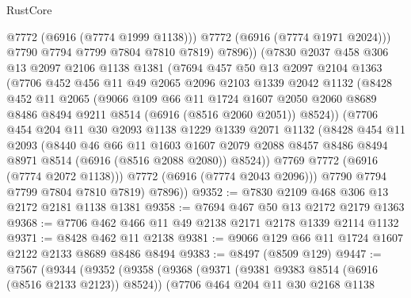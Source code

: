 \begin{lexlean}{RustCore}
\begin{coremodule}
                @7772
                (@6916 (@7774 @1999 @1138)))
              @7772
              (@6916 (@7774 @1971 @2024)))
            @7790
            @7794
            @7799
            @7804
            @7810
            @7819)
          @7896))
      (@7830
        @2037
        @458
        @306
        @13
        @2097
        @2106
        @1138
        @1381
        (@7694
          @457
          @50
          @13
          @2097
          @2104
          @1363
          (@7706
            @452
            @456
            @11
            @49
            @2065
            @2096
            @2103
            @1339
            @2042
            @1132
            (@8428
              @452
              @11
              @2065
              (@9066
                @109
                @66
                @11
                @1724
                @1607
                @2050
                @2060
                @8689
                @8486
                @8494
                @9211
                @8514
                (@6916 (@8516 @2060 @2051))
                @8524))
            (@7706
              @454
              @204
              @11
              @30
              @2093
              @1138
              @1229
              @1339
              @2071
              @1132
              (@8428
                @454
                @11
                @2093
                (@8440
                  @46
                  @66
                  @11
                  @1603
                  @1607
                  @2079
                  @2088
                  @8457
                  @8486
                  @8494
                  @8971
                  @8514
                  (@6916 (@8516 @2088 @2080))
                  @8524))
              @7769
              @7772
              (@6916 (@7774 @2072 @1138)))
            @7772
            (@6916 (@7774 @2043 @2096)))
          @7790
          @7794
          @7799
          @7804
          @7810
          @7819)
        @7896))
@9352 := @7830 @2109 @468 @306 @13 @2172 @2181 @1138 @1381
@9358 := @7694 @467 @50 @13 @2172 @2179 @1363
@9368 := @7706 @462 @466 @11 @49 @2138 @2171 @2178 @1339 @2114 @1132
@9371 := @8428 @462 @11 @2138
@9381 := @9066 @129 @66 @11 @1724 @1607 @2122 @2133 @8689 @8486 @8494
@9383 := @8497 (@8509 @129)
@9447 := @7567
    (@9344
      (@9352
        (@9358
          (@9368
            (@9371 (@9381 @9383 @8514 (@6916 (@8516 @2133 @2123)) @8524))
            (@7706
              @464
              @204
              @11
              @30
              @2168
              @1138

\end{coremodule}
\end{lexlean}
